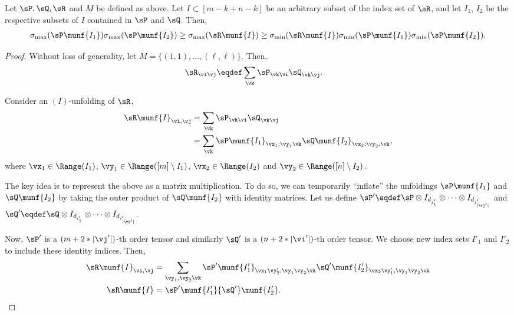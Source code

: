 \begin{lemma}
  \label{lem:tensor-multiplication}
Let $\sP, \sQ, \sR$ and $M$ be defined as above. 
Let $I \subset [m - k + n - k]$ be an arbitrary subset of the index set of $\sR$,
  and let $I_1$, $I_2$ be the respective subsets of $I$ contained in $\sP$ and $\sQ$.
Then,
\begin{align}
  \sigma_{\max}(\sP\munf{I_1}) \sigma_{\max}(\sP\munf{I_2}) 
\ge \sigma_{\max}(\sR\munf{I}) 
\ge \sigma_{\min}(\sR\munf{I}) 
\sigma_{\min}(\sP\munf{I_1}) \sigma_{\min}(\sP\munf{I_2}).
\end{align}
\end{lemma}
\begin{proof}
  Without loss of generality, let $M = \{(1,1), \ldots, (\ell,\ell)\}$. 
  Then,
  \begin{align*}
    \sR_{\vi\vj} &\eqdef \sum_{\vk} \sP_{\vk \vi} \sQ_{\vk \vj}.
  \end{align*}

Consider an $(I)$-unfolding of $\sR$,
  \begin{align*}
    \sR\munf{I}_{\vi,\vj} 
       &= \sum_{\vk} \sP_{\vk \vi} \sQ_{\vk \vj} \\
       &= \sum_{\vk} \sP\munf{I_1}_{\vx_1; \vy_1 \vk} \sQ\munf{I_2}_{\vx_2; \vy_2, \vk},
  \end{align*}
  where $\vx_1 \in \Range(I_1)$, $\vy_1 \in \Range([m] \setminus I_1)$, $\vx_2 \in \Range(I_2)$ and $\vy_2  \in \Range([n] \setminus I_2)$.

The key idea is to represent the above as a matrix multiplication.
To do so, we can temporarily ``inflate'' the unfoldings $\sP\munf{I_1}$
  and $\sQ\munf{I_2}$ by taking the outer product of $\sQ\munf{I_2}$ with
  identity matrices. Let us define 
  $\sP' \eqdef \sP \otimes I_{d_{j'_1}} \otimes \cdots \otimes I_{d_{j'_{|\vj'|}}}$ and 
  $\sQ' \eqdef \sQ \otimes I_{d_{i'_1}} \otimes \cdots \otimes I_{d_{i'_{|\vi'|}}}$.

Now, $\sP'$ is a $(m + 2 * |\vj'|)$-th order tensor and similarly $\sQ'$ is a $(n + 2 * |\vi'|)$-th 
  order tensor. We choose new index sets $I'_1$ and $I'_2$ to include these identity indices. 
Then,
  \begin{align*}
    \sR\munf{I}_{\vi,\vj} 
    &= \sum_{\vy_1, \vy_2 \vk}
    {\sP'}\munf{I'_1}_{\vx_1\vy'_2, \vy_1 \vy_2 \vk} {\sQ'}\munf{I'_2}_{\vx_2\vy'_1, \vy_1 \vy_2 \vk} \\
          \sR\munf{I} &= {\sP'}\munf{I'_1} {\sQ'}\munf{I'_2}.
  \end{align*}


\end{proof}
